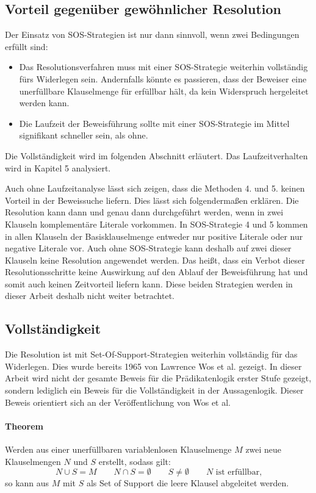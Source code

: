 	
\subsection{Vorteil gegenüber gewöhnlicher Resolution}
Der Einsatz von SOS-Strategien ist nur dann sinnvoll, wenn zwei Bedingungen erfüllt sind:
\begin{itemize}
	\item Das Resolutionsverfahren muss mit einer SOS-Strategie weiterhin vollständig fürs Widerlegen sein. Andernfalls könnte es passieren, dass der Beweiser eine unerfüllbare Klauselmenge für erfüllbar hält, da kein Widerspruch hergeleitet werden kann.
	\item Die Laufzeit der Beweisführung sollte mit einer SOS-Strategie im Mittel signifikant schneller sein, als ohne.

\end{itemize}
Die Vollständigkeit wird im folgenden Abschnitt erläutert. Das Laufzeitverhalten wird in Kapitel 5 analysiert.

Auch ohne Laufzeitanalyse lässt sich zeigen, dass die Methoden 4. und 5. keinen Vorteil in der Beweissuche liefern. Dies lässt sich folgendermaßen erklären. Die Resolution kann dann und genau dann durchgeführt werden, wenn in zwei Klauseln komplementäre Literale vorkommen. In SOS-Strategie 4 und 5 kommen in allen Klauseln der Basisklauselmenge entweder nur positive Literale oder nur negative Literale vor. Auch ohne SOS-Strategie kann deshalb auf zwei dieser Klauseln keine Resolution angewendet werden. Das heißt, dass ein Verbot dieser Resolutionsschritte keine Auswirkung auf den Ablauf der Beweisführung hat und somit auch keinen Zeitvorteil liefern kann. Diese beiden Strategien werden in dieser Arbeit deshalb nicht weiter betrachtet.

		\subsection{Vollständigkeit}		
Die Resolution ist mit Set-Of-Support-Strategien weiterhin vollständig für das Widerlegen. Dies wurde bereits 1965 von Lawrence Wos et al. gezeigt. In dieser Arbeit wird nicht der gesamte Beweis für die Prädikatenlogik erster Stufe gezeigt, sondern lediglich ein Beweis für die Vollständigkeit in der Aussagenlogik. Dieser Beweis orientiert sich an der Veröffentlichung von Wos et al. \cite{Wos1965Sos}

\paragraph{Theorem} Werden aus einer unerfüllbaren variablenlosen Klauselmenge $M$ zwei neue Klauselmengen $N$ und $S$ erstellt, sodass gilt: 
$$N \cup S = M \quad\quad N \cap S = \emptyset \quad\quad S \neq \emptyset \quad\quad N \text{ ist erfüllbar,}$$
so kann aus $M$ mit $S$ als Set of Support die leere Klausel abgeleitet werden.

